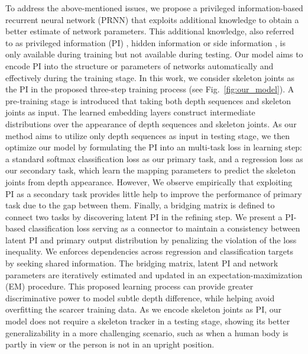 \documentclass[10pt,twocolumn,letterpaper]{article}
\begin{document}
To address the above-mentioned issues, we propose a privileged information-based recurrent neural network (PRNN) that exploits additional knowledge to obtain a better estimate of network parameters. This additional knowledge, also referred to as privileged information (PI) \cite{Vapnik2009544}, hidden information \cite{Wang_2015_CVPR} or side information \cite{Xu_nips_2013, Hoffman_cvpr_2016}, is only available during training but not available during testing. Our model aims to encode PI into the structure or parameters of networks automatically and effectively during the training stage. In this work, we consider skeleton joints as the PI in the proposed three-step training process (see Fig.~\ref{fig:our_model}). A pre-training stage is introduced that taking both depth sequences and skeleton joints as input. The learned embedding layers construct intermediate distributions over the appearance of depth sequences and skeleton joints. As our method aims to utilize only depth sequences as input in testing stage, we then optimize our model by formulating the PI into an multi-task loss in learning step: a standard softmax classification loss as our primary task, and a regression loss as our secondary task, which learn the mapping parameters to predict the skeleton joints from depth appearance. However, We observe empirically that exploiting PI as a secondary task provides little help to improve the performance of primary task due to the gap between them. Finally, a bridging matrix is defined to connect two tasks by discovering latent PI in the refining step. We present a PI-based classification loss serving as a connector to maintain a consistency between latent PI and primary output distribution by penalizing the violation of the loss inequality. We enforces dependencies across regression and classification targets by seeking shared information. The bridging matrix, latent PI and network parameters are iteratively estimated and updated in an expectation-maximization (EM) procedure.
This proposed learning process can provide greater discriminative power to model subtle depth difference, while helping avoid overfitting the scarcer training data. As we encode skeleton joints as PI, our model does not require a skeleton tracker in a testing stage, showing its better generalizability in a more challenging scenario, such as when a human body is partly in view or the person is not in an upright position.
\end{document}
